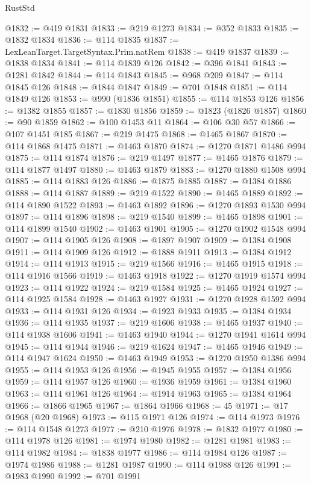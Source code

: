 \begin{lexlean}{RustStd}
\begin{coremodule}
@1832 := @419 @1831
@1833 := @219 @1273
@1834 := @352 @1833
@1835 := @1832 @1834
@1836 := @114 @1835
@1837 := LexLeanTarget.TargetSyntax.Prim.natRem
@1838 := @419 @1837
@1839 := @1838 @1834
@1841 := @114 @1839 @126
@1842 := @396 @1841
@1843 := @1281 @1842
@1844 := @114 @1843
@1845 := @968 @209
@1847 := @114 @1845 @126
@1848 := @1844 @1847
@1849 := @701 @1848
@1851 := @114 @1849 @126
@1853 := @990 (@1836 @1851)
@1855 := @114 @1853 @126
@1856 := @1382 @1855
@1857 := @1830 @1856
@1859 := @1823 (@1826 @1857)
@1860 := @90 @1859
@1862 := @100 @1453 @11
@1864 := @106 @30 @57
@1866 := @107 @1451 @185
@1867 := @219 @1475
@1868 := @1465 @1867
@1870 := @114 @1868 @1475
@1871 := @1463 @1870
@1874 := @1270 @1871 @1486 @994
@1875 := @114 @1874
@1876 := @219 @1497
@1877 := @1465 @1876
@1879 := @114 @1877 @1497
@1880 := @1463 @1879
@1883 := @1270 @1880 @1508 @994
@1885 := @114 @1883 @126
@1886 := @1875 @1885
@1887 := @1384 @1886
@1888 := @114 @1887
@1889 := @219 @1522
@1890 := @1465 @1889
@1892 := @114 @1890 @1522
@1893 := @1463 @1892
@1896 := @1270 @1893 @1530 @994
@1897 := @114 @1896
@1898 := @219 @1540
@1899 := @1465 @1898
@1901 := @114 @1899 @1540
@1902 := @1463 @1901
@1905 := @1270 @1902 @1548 @994
@1907 := @114 @1905 @126
@1908 := @1897 @1907
@1909 := @1384 @1908
@1911 := @114 @1909 @126
@1912 := @1888 @1911
@1913 := @1384 @1912
@1914 := @114 @1913
@1915 := @219 @1566
@1916 := @1465 @1915
@1918 := @114 @1916 @1566
@1919 := @1463 @1918
@1922 := @1270 @1919 @1574 @994
@1923 := @114 @1922
@1924 := @219 @1584
@1925 := @1465 @1924
@1927 := @114 @1925 @1584
@1928 := @1463 @1927
@1931 := @1270 @1928 @1592 @994
@1933 := @114 @1931 @126
@1934 := @1923 @1933
@1935 := @1384 @1934
@1936 := @114 @1935
@1937 := @219 @1606
@1938 := @1465 @1937
@1940 := @114 @1938 @1606
@1941 := @1463 @1940
@1944 := @1270 @1941 @1614 @994
@1945 := @114 @1944
@1946 := @219 @1624
@1947 := @1465 @1946
@1949 := @114 @1947 @1624
@1950 := @1463 @1949
@1953 := @1270 @1950 @1386 @994
@1955 := @114 @1953 @126
@1956 := @1945 @1955
@1957 := @1384 @1956
@1959 := @114 @1957 @126
@1960 := @1936 @1959
@1961 := @1384 @1960
@1963 := @114 @1961 @126
@1964 := @1914 @1963
@1965 := @1384 @1964
@1966 := @1866 @1965
@1967 := @1864 @1966
@1968 := 45
@1971 := @17 @1968 (@20 @1968)
@1973 := @115 @1971 @126
@1974 := @114 @1973
@1976 := @114 @1548 @1273
@1977 := @210 @1976
@1978 := @1832 @1977
@1980 := @114 @1978 @126
@1981 := @1974 @1980
@1982 := @1281 @1981
@1983 := @114 @1982
@1984 := @1838 @1977
@1986 := @114 @1984 @126
@1987 := @1974 @1986
@1988 := @1281 @1987
@1990 := @114 @1988 @126
@1991 := @1983 @1990
@1992 := @701 @1991

\end{coremodule}
\end{lexlean}
